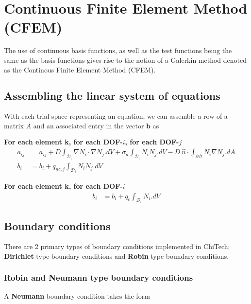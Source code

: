 \documentclass[11pt,letterpaper,titlepage]{article}
\newcommand{\bOmega}{\mathcal{D}}
\numberwithin{equation}{section}
\begin{document}
\newpage
{}
\section{Continuous Finite Element Method (CFEM)}

The use of continuous basis functions, as well as the test functions being the same as the basis functions gives rise to the notion of a Galerkin method denoted as the Continous Finite Element Method (CFEM).

\subsection{Assembling the linear system of equations}
With each trial space representing an equation, we can assemble a row of a matrix $A$ and an associated entry in the vector $\mathbf{b}$ as
 
\vspace{0.25cm}
\textbf{For each element k, for each DOF-$i$, for each DOF-$j$}
\begin{equation*}
\begin{aligned}
a_{ij} &=a_{ij} +  D \int_{\bOmega_i} \nabla N_i  \cdot  \nabla N_j .dV + 
\sigma_a \int_{\bOmega_i} N_i N_j.dV -
D \  \hat{n} \cdot \int_{\partial \bOmega} N_i  \nabla N_j .dA \\
b_i &= b_i 
+ q_{nc,j} \int_{\bOmega_i}  N_i  N_j .dV
\end{aligned}
\end{equation*}

\textbf{For each element k, for each DOF-$i$}
\begin{equation*}
\begin{aligned}
b_i &= b_i + q_c \int_{\bOmega_i} N_i   .dV 
\end{aligned}
\end{equation*}

\subsection{Boundary conditions}
There are 2 primary types of boundary conditions implemented in ChiTech; \textbf{Dirichlet} type boundary conditions and \textbf{Robin} type boundary conditions.

\subsubsection{Robin and Neumann type boundary conditions}
A \textbf{Neumann} boundary condition takes the form
\end{document}
